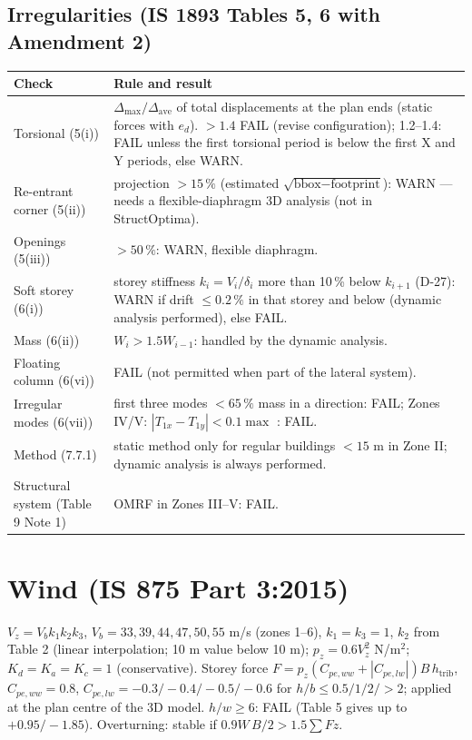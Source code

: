 \documentclass[10pt,a4paper]{article}
\begin{document}
\subsection{Irregularities (IS 1893 Tables 5, 6 with Amendment 2)}
\begin{longtable}{L{38mm}L{126mm}}
\toprule \textbf{Check} & \textbf{Rule and result} \\ \midrule \endhead
Torsional (5(i)) & $\Delta_\text{max}/\Delta_\text{ave}$ of total displacements at the plan ends (static forces with
$e_d$). $>1.4$ FAIL (revise configuration); 1.2--1.4: FAIL unless the first torsional period is below the first X and Y
periods, else WARN. \\
Re-entrant corner (5(ii)) & projection $>15\,\%$ (estimated $\sqrt{\text{bbox}-\text{footprint}}$): WARN --- needs a
flexible-diaphragm 3D analysis (not in StructOptima). \\
Openings (5(iii)) & $>50\,\%$: WARN, flexible diaphragm. \\
Soft storey (6(i)) & storey stiffness $k_i=V_i/\delta_i$ more than 10\,\% below $k_{i+1}$ (D-27): WARN if drift
$\le0.2\,\%$ in that storey and below (dynamic analysis performed), else FAIL. \\
Mass (6(ii)) & $W_i>1.5W_{i-1}$: handled by the dynamic analysis. \\
Floating column (6(vi)) & FAIL (not permitted when part of the lateral system). \\
Irregular modes (6(vii)) & first three modes $<65\,\%$ mass in a direction: FAIL; Zones IV/V: $|T_{1x}-T_{1y}|<0.1\max$
: FAIL. \\
Method (7.7.1) & static method only for regular buildings $<15$ m in Zone II; dynamic analysis is always performed. \\
Structural system (Table 9 Note 1) & OMRF in Zones III--V: FAIL. \\
\bottomrule
\end{longtable}

\section{Wind (IS 875 Part 3:2015)}
$V_z=V_bk_1k_2k_3$, $V_b=33,39,44,47,50,55$ m/s (zones 1--6), $k_1=k_3=1$, $k_2$ from Table 2 (linear
interpolation; 10 m value below 10 m); $p_z=0.6V_z^2$ N/m$^2$; $K_d=K_a=K_c=1$ (conservative).
Storey force $F=p_z(C_{pe,ww}+|C_{pe,lw}|)B\,h_\text{trib}$, $C_{pe,ww}=0.8$, $C_{pe,lw}=-0.3/-0.4/-0.5/-0.6$ for
$h/b\le0.5/1/2/>2$; applied at the plan centre of the 3D model. $h/w\ge6$: FAIL (Table 5 gives up to $+0.95/-1.85$).
Overturning: stable if $0.9W\,B/2>1.5\sum F z$.
\end{document}
